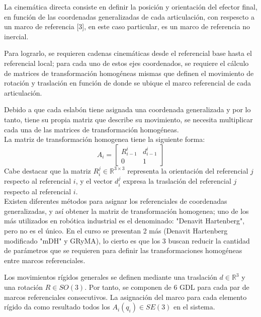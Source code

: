 \documentclass[journal]{IEEEtran}
\begin{document}
    \noindent La cinemática directa consiste en definir la posición y orientación del efector final, en función de las
    coordenadas generalizadas de cada articulación, con respescto a un marco de referencia [3], en este caso particular,
    es un marco de referencia no inercial.

    Para lograrlo, se requieren cadenas cinemáticas desde el referencial base hasta el referencial local; para cada uno de
    estos ejes coordenados, se requiere el cálculo de matrices de transformación homogéneas mismas que definen el movimiento
    de rotación y traslación en función de donde se ubique el marco referencial de cada articulación. 

    Debido a que cada eslabón tiene asignada una coordenada generalizada y por lo tanto, tiene su propia matriz que describe
    su movimiento, se necesita multiplicar cada una de las matrices de transformación homogéneas.
    \\
    La matriz de transformación homogenea tiene la siguiente forma:
    \begin{equation*} A_i = 
        \begin{bmatrix}
        R^i_{i-1} & d^i_{i-1}\\
        0 & 1
        \end{bmatrix}
    \end{equation*}
    \noindent Cabe destacar que la matriz $R^j_i \in \mathbb{R}^{3\times 3}$ representa la orientación del referencial $j$
    respecto al referencial $i$, y el vector $d^j_{i}$ expresa la traslación del referencial $j$ respecto al referencial $i$.\\

    \noindent Existen diferentes métodos para asignar los referenciales de coordenadas generalizadas, y así obtener la matriz
    de transformación homogenea; uno de los más utilizados en robótica industrial es el denominado: "Denavit Hartenberg",
    pero no es el único. En el curso se presentan 2 más (Denavit Hartenberg modificado "mDH" y GRyMA), lo cierto es que los
    3 buscan reducir la cantidad de parámetros que se requieren para definir las transformaciones homogéneas entre marcos
    referenciales. 

    \noindent Los movimientos rígidos generales se definen mediante una traslación $d \in \mathbb{R}^3$ y una rotación
    $R \in SO(3)$. Por tanto, se componen de 6 GDL para cada par de marcos referenciales consecutivos. La asignación del marco
    para cada elemento rígido da como resultado todos los $A_i (q_i) \in SE(3)$ en el sistema.
\end{document}
